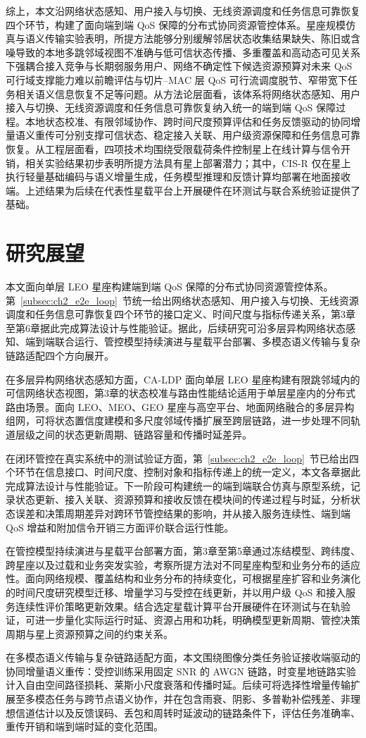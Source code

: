 综上，本文沿网络状态感知、用户接入与切换、无线资源调度和任务信息可靠恢复四个环节，构建了面向端到端 QoS 保障的分布式协同资源管控体系。星座规模仿真与语义传输实验表明，所提方法能够分别缓解邻居状态收集结果缺失、陈旧或含噪导致的本地多跳邻域视图不准确与低可信状态传播、多重覆盖和高动态可见关系下强耦合接入竞争与长期弱服务用户、网络不确定性下候选资源预算对未来 QoS 可行域支撑能力难以前瞻评估与切片--MAC 层 QoS 可行流调度脱节、窄带宽下任务相关语义信息恢复不足等问题。从方法论层面看，该体系将网络状态感知、用户接入与切换、无线资源调度和任务信息可靠恢复纳入统一的端到端 QoS 保障过程。本地状态校准、有限邻域协作、跨时间尺度预算评估和任务反馈驱动的协同增量语义重传可分别支撑可信状态、稳定接入关联、用户级资源保障和任务信息可靠恢复。从工程层面看，四项技术均围绕受限载荷条件控制星上在线计算与信令开销，相关实验结果初步表明所提方法具有星上部署潜力；其中，CIS-R 仅在星上执行轻量基础编码与语义增量生成，任务模型推理和反馈计算均部署在地面接收端。上述结果为后续在代表性星载平台上开展硬件在环测试与联合系统验证提供了基础。

\section{研究展望}

本文面向单层 LEO 星座构建端到端 QoS 保障的分布式协同资源管控体系。第~\ref{subsec:ch2_e2e_loop}~节统一给出网络状态感知、用户接入与切换、无线资源调度和任务信息可靠恢复四个环节的接口定义、时间尺度与指标传递关系，第3章至第6章据此完成算法设计与性能验证。据此，后续研究可沿多层异构网络状态感知、端到端联合运行、管控模型持续演进与星载平台部署、多模态语义传输与复杂链路适配四个方向展开。

在多层异构网络状态感知方面，CA-LDP 面向单层 LEO 星座构建有限跳邻域内的可信网络状态视图，第3章的状态校准与路由性能结论适用于单层星座内的分布式路由场景。面向 LEO、MEO、GEO 星座与高空平台、地面网络融合的多层异构组网，可将状态置信度建模和多尺度邻域传播扩展至跨层链路，进一步处理不同轨道层级之间的状态更新周期、链路容量和传播时延差异。

在闭环管控在真实系统中的测试验证方面，第~\ref{subsec:ch2_e2e_loop}~节已给出四个环节在信息接口、时间尺度、控制对象和指标传递上的统一定义，本文各章据此完成算法设计与性能验证。下一阶段可构建统一的端到端联合仿真与原型系统，记录状态更新、接入关联、资源预算和接收反馈在模块间的传递过程与时延，分析状态误差和决策周期差异对跨环节管控结果的影响，并从接入服务连续性、端到端 QoS 增益和附加信令开销三方面评价联合运行性能。

在管控模型持续演进与星载平台部署方面，第3章至第5章通过冻结模型、跨纬度、跨星座以及过载和业务突发实验，考察所提方法对不同星座构型和业务分布的适应性。面向网络规模、覆盖结构和业务分布的持续变化，可根据星座扩容和业务演化的时间尺度研究模型迁移、增量学习与受控在线更新，并以用户级 QoS 和接入服务连续性评价策略更新效果。结合选定星载计算平台开展硬件在环测试与在轨验证，可进一步量化实际运行时延、资源占用和功耗，明确模型更新周期、管控决策周期与星上资源预算之间的约束关系。

在多模态语义传输与复杂链路适配方面，本文围绕图像分类任务验证接收端驱动的协同增量语义重传：受控训练采用固定 SNR 的 AWGN 链路，时变星地链路实验计入自由空间路径损耗、莱斯小尺度衰落和传播时延。后续可将选择性增量传输扩展至多模态任务与跨节点语义协作，并在包含雨衰、阴影、多普勒补偿残差、非理想信道估计以及反馈误码、丢包和周转时延波动的链路条件下，评估任务准确率、重传开销和端到端时延的变化范围。
